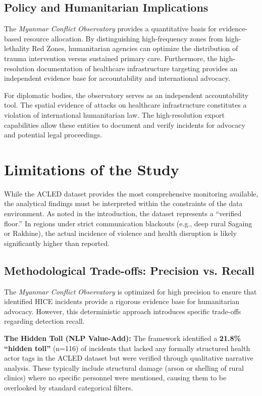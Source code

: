 \documentclass[conference]{IEEEtran}
\begin{document}
\subsection{Policy and Humanitarian Implications}

The \textit{Myanmar Conflict Observatory} provides a quantitative basis for evidence-based resource allocation. By distinguishing high-frequency zones from high-lethality Red Zones, humanitarian agencies can optimize the distribution of trauma intervention versus sustained primary care. Furthermore, the high-resolution documentation of healthcare infrastructure targeting provides an independent evidence base for accountability and international advocacy.

For diplomatic bodies, the observatory serves as an independent accountability tool. The spatial evidence of attacks on healthcare infrastructure constitutes a violation of international humanitarian law. The high-resolution export capabilities allow these entities to document and verify incidents for advocacy and potential legal proceedings.

\section{Limitations of the Study}

While the ACLED dataset provides the most comprehensive monitoring available, the analytical findings must be interpreted within the constraints of the data environment. As noted in the introduction, the dataset represents a ``verified floor.'' In regions under strict communication blackouts (e.g., deep rural Sagaing or Rakhine), the actual incidence of violence and health disruption is likely significantly higher than reported.

\subsection{Methodological Trade-offs: Precision vs. Recall}
The \textit{Myanmar Conflict Observatory} is optimized for high precision to ensure that identified HICE incidents provide a rigorous evidence base for humanitarian advocacy. However, this deterministic approach introduces specific trade-offs regarding detection recall.

\textbf{The Hidden Toll (NLP Value-Add):} The framework identified a \textbf{21.8\% ``hidden toll''} (n=116) of incidents that lacked any formally structured health actor tags in the ACLED dataset but were verified through qualitative narrative analysis. These typically include structural damage (arson or shelling of rural clinics) where no specific personnel were mentioned, causing them to be overlooked by standard categorical filters.
\end{document}
